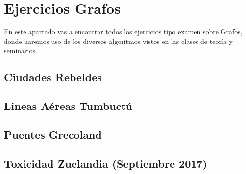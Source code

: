 \chapter*{Ejercicios Grafos}
En este apartado vas a encontrar todos los ejercicios tipo examen sobre Grafos, donde haremos uso de los diversos algoritmos vistos en las clases de teoría y seminarios.

\section*{Ciudades Rebeldes}
{}
\label{sec:EjercicioGrafos1}


\newpage
\section*{Lineas Aéreas Tumbuctú}
{}
\label{sec:EjercicioGrafos2}


\newpage
\section*{Puentes Grecoland}
{}
\label{sec:EjercicioGrafos3}


\newpage
\section*{Toxicidad Zuelandia (Septiembre 2017)}
{}
\label{sec:EjercicioGrafos4}
